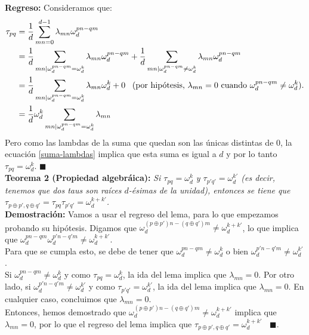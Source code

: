 \textbf{Regreso:} Consideramos que:
\begin{align*}
\tau_{pq}& = \dfrac{1}{d} \sum_{mn=0}^{d-1} \lambda_{mn} \omega_d^{pn-qm} \\
&= \dfrac{1}{d} \sum_{mn | \omega_d^{pn-qm} = \omega_d^k} \lambda_{mn} \omega_d^{pn-qm} +\dfrac{1}{d} \sum_{mn | \omega_d^{pn-qm} \neq \omega_d^k} \lambda_{mn} \omega_d^{pn-qm} \\
& = \dfrac{1}{d} \sum_{mn | \omega_d^{pn-qm} = \omega_d^k} \lambda_{mn} \omega_d^k + 0 \;\;\; \text{(por hipótesis, $ \lambda_{mn} = 0$ cuando $ \omega_d^{pn-qm} \neq \omega_d^k)$.} \\
& =  \dfrac{1}{d} \omega_d^k \sum_{mn | \omega_d^{pn-qm} = \omega_d^k} \lambda_{mn}
\end{align*}
Pero como las lambdas de la suma que quedan son las únicas distintas de $0$, la ecuación \ref{suma-lambdas} implica que esta suma es igual a $d$ y por lo tanto $\tau_{pq} = \omega_d^k$. $\blacksquare$ \\

\textbf{Teorema 2 (Propiedad algebráica):}  \textit{Si $\tau_{pq} = \omega_d^k$ y $\tau_{p'q'} = \omega_d^{k'}$ (es decir, tenemos que dos taus son raíces $d$-ésimas de la unidad), entonces se tiene que $\tau_{p \oplus p' , q \oplus q'} = \tau_{pq} \tau_{p'q'} = \omega_d^{k+k'}$.} \\

\textbf{Demostración:} Vamos a usar el regreso del lema, para lo que empezamos probando su hip\'otesis. Digamos que $\omega_d^{(p \oplus p') n - (q \oplus q')m} \neq \omega_d^{k+k'}$, lo que implica que $\omega_d^{p n - qm} \omega_d^{p'n - q'm} \neq \omega_d^{k+k'}$. \\
Para que se cumpla esto, se debe de tener que $ \omega_d^{p n - qm} \neq \omega_d^k$ o bien $\omega_d^{p'n-q'm} \neq \omega_d^{k'}$. \\

Si $\omega_d^{p n - qm} \neq \omega_d^k$ y como $\tau_{pq} = \omega_d^k$, la ida del lema implica que $\lambda_{mn} =0$. Por otro lado, si $\omega_d^{p'n-q'm} \neq \omega_d^{k'}$ y como $\tau_{p'q'} = \omega_d^{k'}$, la ida del lema implica que $\lambda_{mn} = 0$. En cualquier caso, concluimos que $\lambda_{mn} = 0$. \\

Entonces, hemos demostrado que $\omega_d^{(p \oplus p')n - (q\oplus q')m} \neq \omega_d^{k+k'}$ implica que $\lambda_{mn} = 0$, por lo que el regreso del lema implica que $\tau_{p \oplus p', q \oplus q'} = \omega_d^{k+k'}$ $\;\; \blacksquare$. \\

